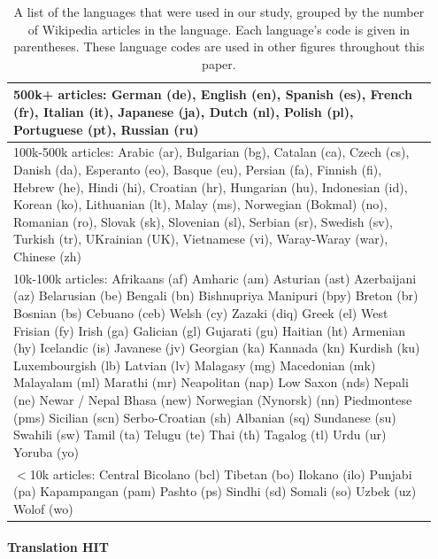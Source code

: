 \documentclass[11pt]{article}
\begin{document}
\begin{table}[h]
\scriptsize 
\begin{center}
\begin{tabular}{|p{0.95\linewidth}|}
\hline
{\sc 500k+ articles:} German (de), English (en), Spanish (es), French (fr), Italian (it), Japanese (ja), Dutch (nl), Polish (pl), Portuguese (pt), Russian (ru)\\
\hline
{\sc 100k-500k articles:} Arabic (ar), Bulgarian (bg), Catalan (ca), Czech (cs), Danish (da), Esperanto (eo), Basque (eu), Persian (fa), Finnish (fi), Hebrew (he), Hindi (hi), Croatian (hr), Hungarian (hu), Indonesian (id), Korean (ko), Lithuanian (lt), Malay (ms), Norwegian (Bokmal) (no), Romanian (ro), Slovak (sk), Slovenian (sl), Serbian (sr), Swedish (sv), Turkish (tr), UKrainian (UK), Vietnamese (vi), Waray-Waray (war), Chinese (zh)\\
\hline
{\sc 10k-100k articles:}
Afrikaans (af) Amharic (am) Asturian (ast) Azerbaijani (az) Belarusian (be) Bengali (bn) Bishnupriya Manipuri (bpy) Breton (br) Bosnian (bs) Cebuano (ceb) Welsh (cy) Zazaki (diq) Greek (el) West Frisian (fy) Irish (ga) Galician (gl) Gujarati (gu) Haitian (ht) Armenian (hy) Icelandic (is) Javanese (jv) Georgian (ka) Kannada (kn) Kurdish (ku) Luxembourgish (lb) Latvian (lv) Malagasy (mg) Macedonian (mk) Malayalam (ml) Marathi (mr) Neapolitan (nap) Low Saxon (nds) Nepali (ne) Newar / Nepal Bhasa (new) Norwegian (Nynorsk) (nn) Piedmontese (pms) Sicilian (scn) Serbo-Croatian (sh) Albanian (sq) Sundanese (su) Swahili (sw) Tamil (ta) Telugu (te) Thai (th) Tagalog (tl) Urdu (ur) Yoruba (yo)\\ 
\hline
{\sc $<$10k articles:} Central Bicolano (bcl) Tibetan (bo) Ilokano (ilo) Punjabi (pa) Kapampangan (pam) Pashto (ps) Sindhi (sd) Somali (so) Uzbek (uz) Wolof (wo)\\

\hline
\end{tabular}
\end{center}
\normalsize
\caption{A list of the languages that were used in our study, grouped by the number of Wikipedia articles in the language.  Each language's code is given in parentheses.  These language codes are used in other figures throughout this paper.}\label{Wikipedia-buckets}
\end{table}%


\paragraph{Translation HIT}
\end{document}
